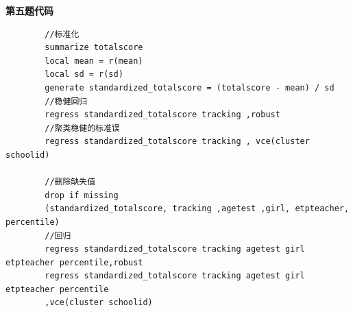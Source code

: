 \documentclass[a4paper]{ctexart}
\theoremstyle{remark}
\begin{document}
\begin{itemize}
{\fontsize{8pt}{12pt}\selectfont \textbf{第五题代码}}
    \begin{lstlisting}
        //标准化
        summarize totalscore
        local mean = r(mean)
        local sd = r(sd)
        generate standardized_totalscore = (totalscore - mean) / sd
        //稳健回归
        regress standardized_totalscore tracking ,robust
        //聚类稳健的标准误
        regress standardized_totalscore tracking , vce(cluster schoolid)
        
        //删除缺失值
        drop if missing
        (standardized_totalscore, tracking ,agetest ,girl, etpteacher, percentile)
        //回归
        regress standardized_totalscore tracking agetest girl etpteacher percentile,robust
        regress standardized_totalscore tracking agetest girl etpteacher percentile 
        ,vce(cluster schoolid)
    \end{lstlisting}

\end{itemize}
\end{document}
